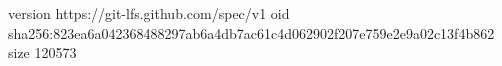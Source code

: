 version https://git-lfs.github.com/spec/v1
oid sha256:823ea6a042368488297ab6a4db7ac61c4d062902f207e759e2e9a02c13f4b862
size 120573
